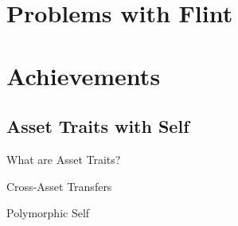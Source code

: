 \documentclass{beamer}
\begin{document}
\section{Problems with Flint}

\section{Achievements}
\subsection{Asset Traits with Self}

\begin{frame}{What are Asset Traits?}
\end{frame}

\begin{frame}{Cross-Asset Transfers}
\end{frame}

\begin{frame}{Polymorphic Self}
\end{frame}
\end{document}
